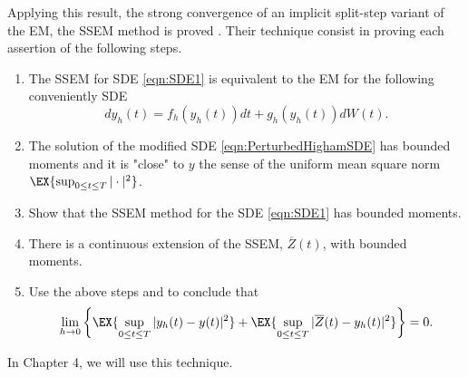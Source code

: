 	Applying this result, the strong convergence of an implicit split-step variant of the EM, the
SSEM method is proved . 
Their technique consist in proving each assertion of the following steps.
\begin{enumerate}[\bf{Step} 1:]
	\item
		\label{stp:EMCorrespondence}
		The SSEM for SDE \eqref{eqn:SDE1} is equivalent to the EM for the following conveniently SDE
		\begin{equation}\label{eqn:PerturbedHighamSDE}
			dy_h(t)= f_h(y_h(t))dt +g_h(y_h(t))dW(t).
		\end{equation}
	\item\label{stp:PerturbedSolution}
			The solution of the modified SDE \eqref{eqn:PerturbedHighamSDE} has bounded moments and it is 
			"close" to  $y$ the sense of the uniform mean square norm 
			$
				\EX{\sup_{0\leq t\leq T}|\cdot|^2}
			$.
	\item
	\label{stp:MethodBoundedMoments}
		Show that the SSEM method for the SDE \eqref{eqn:SDE1} has bounded moments.
	\item
		There is a continuous extension of the SSEM, $\overline{Z}(t)$, with bounded moments.
	\item
		Use the above steps and  to conclude that
		\begin{equation}
			\lim_{h\to 0}
			\left\{
				\EX{\sup_{0\leq t\leq T}|y_h(t)-y(t)|^2}
			+
			\EX{\sup_{0\leq t\leq T}|\overline{Z}(t) -y_h(t)|^2}
			\right\}=0.
		\end{equation}
\end{enumerate}
In Chapter 4, we will use this technique.
